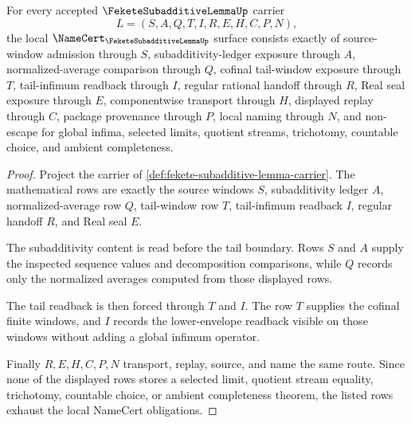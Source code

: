 \begin{theorem}
\label{thm:fekete-subadditive-lemma-namecert-obligations}
For every accepted $\FeketeSubadditiveLemmaUp$ carrier
$$
L=(S,A,Q,T,I,R,E,H,C,P,N),
$$
the local $\NameCert_{\FeketeSubadditiveLemmaUp}$ surface consists exactly of source-window admission through $S$, subadditivity-ledger exposure through $A$, normalized-average comparison through $Q$, cofinal tail-window exposure through $T$, tail-infimum readback through $I$, regular rational handoff through $R$, Real seal exposure through $E$, componentwise transport through $H$, displayed replay through $C$, package provenance through $P$, local naming through $N$, and non-escape for global infima, selected limits, quotient streams, trichotomy, countable choice, and ambient completeness.
\end{theorem}
\begin{proof}
Project the carrier of \autoref{def:fekete-subadditive-lemma-carrier}. The mathematical rows are exactly the source windows $S$, subadditivity ledger $A$, normalized-average row $Q$, tail-window row $T$, tail-infimum readback $I$, regular handoff $R$, and Real seal $E$.

The subadditivity content is read before the tail boundary. Rows $S$ and $A$ supply the inspected sequence values and decomposition comparisons, while $Q$ records only the normalized averages computed from those displayed rows.

The tail readback is then forced through $T$ and $I$. The row $T$ supplies the cofinal finite windows, and $I$ records the lower-envelope readback visible on those windows without adding a global infimum operator.

Finally $R,E,H,C,P,N$ transport, replay, source, and name the same route. Since none of the displayed rows stores a selected limit, quotient stream equality, trichotomy, countable choice, or ambient completeness theorem, the listed rows exhaust the local NameCert obligations.
\end{proof}

